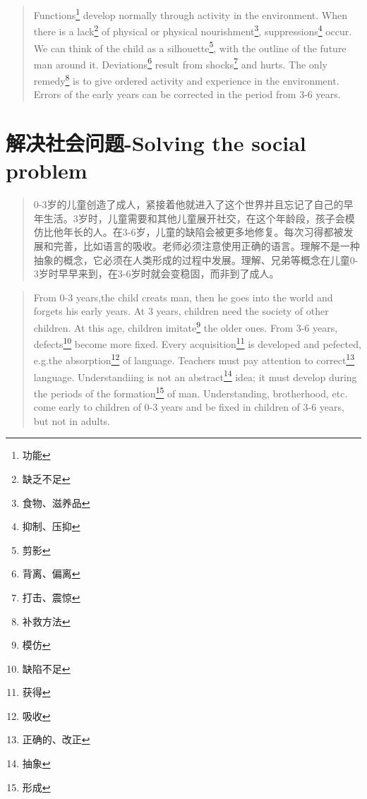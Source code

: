 \documentclass[lang=cn,10pt]{elegantbook}
\begin{document}
\begin{tcolorbox}
\begin{quote}
{\small Functions\footnote{功能} develop normally through activity in the environment. When there is a lack\footnote{缺乏不足} of physical or physical nourishment\footnote{食物、滋养品}, suppressions\footnote{抑制、压抑} occur. We can think of the child as a silhouette\footnote{剪影}, with the outline of the future man around it. Deviations\footnote{背离、偏离} result from shocks\footnote{打击、震惊} and hurts. The only remedy\footnote{补救方法} is to give ordered activity and experience in the environment. Errors of the early years can be corrected in the period from 3-6 years.}
\end{quote}
\end{tcolorbox}


\chapter{解决社会问题-Solving the social problem}

\begin{quote}
{\small 0-3岁的儿童创造了成人，紧接着他就进入了这个世界并且忘记了自己的早年生活。3岁时，儿童需要和其他儿童展开社交，在这个年龄段，孩子会模仿比他年长的人。在3-6岁，儿童的缺陷会被更多地修复。每次习得都被发展和完善，比如语言的吸收。老师必须注意使用正确的语言。理解不是一种抽象的概念，它必须在人类形成的过程中发展。理解、兄弟等概念在儿童0-3岁时早早来到，在3-6岁时就会变稳固，而非到了成人。}
\end{quote}

\begin{tcolorbox}
\begin{quote}
{\small From 0-3 years,the child creats man, then he goes into the world and forgets his early years. At 3 years, children need the society of other children. At this age, children imitate\footnote{模仿} the older ones. From 3-6 years, defects\footnote{缺陷不足} become more fixed. Every acquisition\footnote{获得} is developed and pefected, e.g.the absorption\footnote{吸收} of language. Teachers must pay attention to correct\footnote{正确的、改正} language. Understandiing is not an abstract\footnote{抽象} idea; it must develop during the periods of the formation\footnote{形成} of man. Understanding, brotherhood, etc. come early to children of 0-3 years and be fixed in children of 3-6 years, but not in adults.}
\end{quote}
\end{tcolorbox}
 
\end{document}
